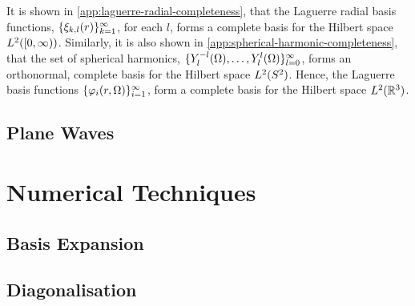 \documentclass[draft]{article}
\begin{document}
It is shown in \autoref{app:laguerre-radial-completeness}, that the Laguerre
radial basis functions, $\lbrace\xi_{k, l}(r)\rbrace_{k = 1}^{\infty}$, for each
$l$, forms a complete basis for the Hilbert space $L^{2}([0, \infty))$.
Similarly, it is also shown in \autoref{app:spherical-harmonic-completeness},
that the set of spherical harmonics,
$\lbrace Y_{l}^{-l}(\Omega), \dotsc, Y_{l}^{l}(\Omega)\rbrace_{l = 0}^{\infty}$,
forms an orthonormal, complete basis for the Hilbert space $L^{2}(S^{2})$.
Hence, the Laguerre basis functions
$\lbrace\varphi_{i}(r, \Omega)\rbrace_{i = 1}^{\infty}$, form a complete basis
for the Hilbert space $L^{2}(\mathbb{R}^{3})$.

\subsection{Plane Waves}
\label{app:plane-waves}

\section{Numerical Techniques}
\label{app:numerical-techniques}

\subsection{Basis Expansion}
\label{app:basis-expansion}


\subsection{Diagonalisation}
\label{app:diagonalisation}


\clearpage

\todos
\end{document}
